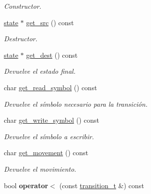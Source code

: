 \begin{DoxyCompactItemize}
\begin{DoxyCompactList}\small\item\em Constructor. \end{DoxyCompactList}\item 
\hyperlink{classstate}{state} $\ast$ \hyperlink{classtransition__t_aac5048fbc4307cc982437e393cf97c89}{get\+\_\+src} () const 
\begin{DoxyCompactList}\small\item\em Destructor. \end{DoxyCompactList}\item 
\hyperlink{classstate}{state} $\ast$ \hyperlink{classtransition__t_a91eb01ea36496fd40b84f5f68b598ca6}{get\+\_\+dest} () const 
\begin{DoxyCompactList}\small\item\em Devuelve el estado final. \end{DoxyCompactList}\item 
char \hyperlink{classtransition__t_ab3292c1a0ac802734292ec8d7693cb1f}{get\+\_\+read\+\_\+symbol} () const 
\begin{DoxyCompactList}\small\item\em Devuelve el símbolo necesario para la transición. \end{DoxyCompactList}\item 
char \hyperlink{classtransition__t_a5ed16ea20f144264552513af0fddae72}{get\+\_\+write\+\_\+symbol} () const 
\begin{DoxyCompactList}\small\item\em Devuelve el símbolo a escribir. \end{DoxyCompactList}\item 
char \hyperlink{classtransition__t_af4625e65d423858e98d4c55f6beb60c9}{get\+\_\+movement} () const 
\begin{DoxyCompactList}\small\item\em Devuelve el movimiento. \end{DoxyCompactList}\item 
\hypertarget{classtransition__t_ab8a2cd43901028a58d08f33169382fc5}{}bool {\bfseries operator$<$} (const \hyperlink{classtransition__t}{transition\+\_\+t} \&) const \label{classtransition__t_ab8a2cd43901028a58d08f33169382fc5}

\end{DoxyCompactItemize}
